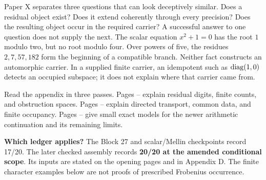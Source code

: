 Paper X separates three questions that can look deceptively similar. Does a residual object exist? Does it extend coherently through every precision? Does the resulting object occur in the required carrier? A successful answer to one question does not supply the next.
The scalar equation $x^2+1=0$ has the root $1$ modulo two, but no root modulo four. Over powers of five, the residues $2,7,57,182$ form the beginning of a compatible branch. Neither fact constructs an automorphic carrier. In a supplied finite carrier, an idempotent such as $\operatorname{diag}(1,0)$ detects an occupied subspace; it does not explain where that carrier came from.

Read the appendix in three passes. Pages -- explain residual digits, finite counts, and obstruction spaces. Pages -- explain directed transport, common data, and finite occupancy. Pages -- give small exact models for the newer arithmetic continuation and its remaining limits.
\begin{insight}
\textbf{Which ledger applies?} The Block 27 and scalar/Mellin checkpoints record 17/20. The later checked assembly records \textbf{20/20 at the amended conditional scope}. Its inputs are stated on the opening pages and in Appendix D. The finite character examples below are not proofs of prescribed Frobenius occurrence.
\end{insight}

